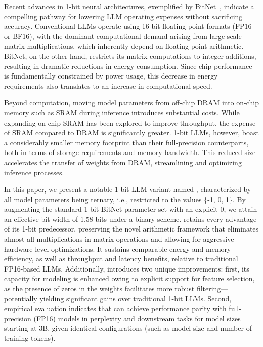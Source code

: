 Recent advances in 1-bit neural architectures, exemplified by BitNet~\cite{bitnet}, indicate a compelling pathway for lowering LLM operating expenses without sacrificing accuracy. Conventional LLMs operate using 16-bit floating-point formats (FP16 or BF16), with the dominant computational demand arising from large-scale matrix multiplications, which inherently depend on floating-point arithmetic. BitNet, on the other hand, restricts its matrix computations to integer additions, resulting in dramatic reductions in energy consumption. Since chip performance is fundamentally constrained by power usage, this decrease in energy requirements also translates to an increase in computational speed.

Beyond computation, moving model parameters from off-chip DRAM into on-chip memory such as SRAM during inference introduces substantial costs. While expanding on-chip SRAM has been explored to improve throughput, the expense of SRAM compared to DRAM is significantly greater. 1-bit LLMs, however, boast a considerably smaller memory footprint than their full-precision counterparts, both in terms of storage requirements and memory bandwidth. This reduced size accelerates the transfer of weights from DRAM, streamlining and optimizing inference processes.

In this paper, we present a notable 1-bit LLM variant named \textbf{}, characterized by all model parameters being ternary, i.e., restricted to the values \{-1, 0, 1\}. By augmenting the standard 1-bit BitNet parameter set with an explicit 0, we attain an effective bit-width of 1.58 bits under a binary scheme.  retains every advantage of its 1-bit predecessor, preserving the novel arithmetic framework that eliminates almost all multiplications in matrix operations and allowing for aggressive hardware-level optimizations. It sustains comparable energy and memory efficiency, as well as throughput and latency benefits, relative to traditional FP16-based LLMs. Additionally,  introduces two unique improvements: first, its capacity for modeling is enhanced owing to explicit support for feature selection, as the presence of zeros in the weights facilitates more robust filtering—potentially yielding significant gains over traditional 1-bit LLMs. Second, empirical evaluation indicates that  can achieve performance parity with full-precision (FP16) models in perplexity and downstream tasks for model sizes starting at 3B, given identical configurations (such as model size and number of training tokens).

